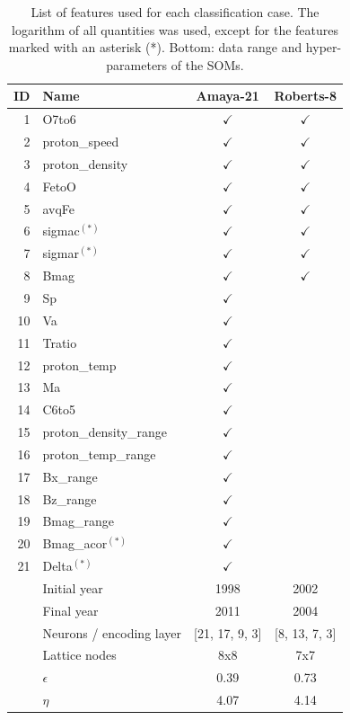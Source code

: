 \documentclass[utf8]{frontiersSCNS} %
\begin{document}
\begin{table}\centering
	\begin{tabular}{@{}rlcc@{}}
		\toprule
		ID & Name  & Amaya-21 & Roberts-8 \\
		\midrule
		1 & O7to6 & $\checkmark$ & $\checkmark$ \\
		2 & proton\_speed & $\checkmark$ & $\checkmark$ \\
		3 & proton\_density & $\checkmark$ & $\checkmark$ \\
		4 & FetoO & $\checkmark$ & $\checkmark$ \\
		5 & avqFe & $\checkmark$ & $\checkmark$ \\
		6 & sigmac$^{(*)}$ & $\checkmark$ & $\checkmark$ \\
		7 & sigmar$^{(*)}$ & $\checkmark$ & $\checkmark$ \\
		8 & Bmag & $\checkmark$ & $\checkmark$ \\
		9 & Sp & $\checkmark$ & \\
		10 & Va & $\checkmark$ & \\
		11 & Tratio & $\checkmark$ & \\
		12 & proton\_temp & $\checkmark$ & \\
		13 & Ma & $\checkmark$ & \\
		14 & C6to5 & $\checkmark$ & \\
		15 & proton\_density\_range & $\checkmark$ & \\
		16 & proton\_temp\_range & $\checkmark$ & \\
		17 & Bx\_range & $\checkmark$ & \\
		18 & Bz\_range & $\checkmark$ & \\
		19 & Bmag\_range & $\checkmark$ & \\
		20 & Bmag\_acor$^{(*)}$ & $\checkmark$ & \\
		21 & Delta$^{(*)}$ & $\checkmark$ & \\
		\midrule
		 & Initial year & 1998 & 2002 \\
		 & Final year & 2011 & 2004 \\
		 & Neurons / encoding layer & [21, 17, 9, 3] & [8, 13, 7, 3] \\
		 & Lattice nodes &  8x8 &  7x7 \\
		 & $\epsilon$ &  0.39 & 0.73 \\
		 & $\eta$ & 4.07 & 4.14 \\
		\bottomrule
	\end{tabular}
	\caption{List of features used for each classification case. The logarithm of all quantities was used, except for the features marked with an asterisk (*). Bottom: data range and hyper-parameters of the SOMs.}
	\label{tab:features}
\end{table}
\end{document}
